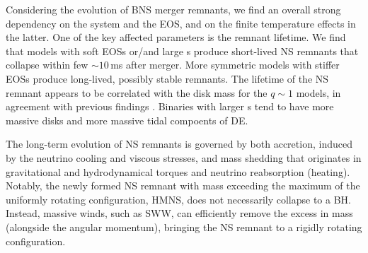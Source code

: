
Considering the \pmerg{} evolution of \ac{BNS} merger remnants, we find an
overall strong dependency on the system \mr{} and the \ac{EOS}, and on the 
finite temperature effects in the latter. One of the key affected 
parameters is the remnant lifetime. We find that models with 
soft \acp{EOS} or/and large \mr{}s produce short-lived \ac{NS} remnants that 
collapse within few ${\sim}10\,$ms after merger. 
%
More symmetric models with stiffer \acp{EOS} produce long-lived, possibly 
stable remnants. The lifetime of the \ac{NS} remnant appears to be correlated with the 
disk mass for the $q\sim 1$ models, in agreement with previous findings 
\citep{Radice:2017lry,Radice:2018pdn}.
Binaries with larger \mr{}s tend to have more massive disks and more massive tidal 
compoents of \ac{DE}.
%

The long-term evolution of \pmerg{} \ac{NS} remnants is governed by both accretion, 
induced by the neutrino cooling and viscous stresses, and mass shedding that originates 
in gravitational and hydrodynamical torques and neutrino reabsorption (heating). 
Notably, the newly formed \ac{NS} remnant with mass exceeding the 
maximum of the uniformly rotating configuration, \ac{HMNS}, does not necessarily collapse 
to a \ac{BH}. Instead, massive winds, such as \ac{SWW}, can efficiently remove the 
excess in mass (alongside the angular momentum), bringing the \ac{NS} remnant 
to a rigidly rotating configuration.
%

